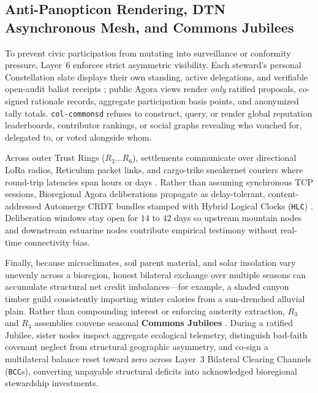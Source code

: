 \subsection{Anti-Panopticon Rendering, DTN Asynchronous Mesh, and Commons Jubilees}

To prevent civic participation from mutating into surveillance or conformity pressure, Layer~6 enforces strict asymmetric visibility. Each steward's personal Constellation slate displays their own standing, active delegations, and verifiable open-audit ballot receipts \parencite{adida2008helios,juels2005coercion}; public Agora views render \emph{only} ratified proposals, co-signed rationale records, aggregate participation basis points, and anonymized tally totals. \texttt{col-commonsd} refuses to construct, query, or render global reputation leaderboards, contributor rankings, or social graphs revealing who vouched for, delegated to, or voted alongside whom.

Across outer Trust Rings ($R_3 \dots R_6$), settlements communicate over directional LoRa radios, Reticulum packet links, and cargo-trike sneakernet couriers where round-trip latencies span hours or days \parencite{fall2003}. Rather than assuming synchronous TCP sessions, Bioregional Agora deliberations propagate as delay-tolerant, content-addressed Automerge CRDT bundles \parencite{kleppmann2017automerge,shapiro2011crdt} stamped with Hybrid Logical Clocks (\texttt{HLC}) \parencite{kulkarni2014logical,lamport1978time}. Deliberation windows stay open for $14$ to $42$ days so upstream mountain nodes and downstream estuarine nodes contribute empirical testimony without real-time connectivity bias.

Finally, because microclimates, soil parent material, and solar insolation vary unevenly across a bioregion, honest bilateral exchange over multiple seasons can accumulate structural net credit imbalances---for example, a shaded canyon timber guild consistently importing winter calories from a sun-drenched alluvial plain. Rather than compounding interest or enforcing austerity extraction, $R_3$ and $R_4$ assemblies convene seasonal \textbf{Commons Jubilees} \parencite{ostrom1990,kropotkin1902}. During a ratified Jubilee, sister nodes inspect aggregate ecological telemetry, distinguish bad-faith covenant neglect from structural geographic asymmetry, and co-sign a multilateral balance reset toward zero across Layer~3 Bilateral Clearing Channels (\texttt{BCC}s), converting unpayable structural deficits into acknowledged bioregional stewardship investments.

